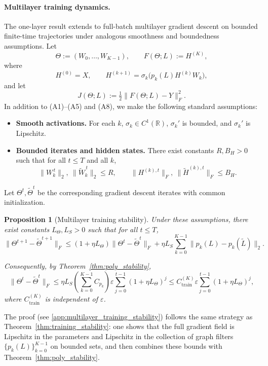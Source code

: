 \documentclass{article}
\newtheorem{proposition}{Proposition}
\begin{document}
\paragraph{Multilayer training dynamics.}
The one-layer result extends to full-batch multilayer gradient descent on bounded finite-time trajectories under analogous smoothness and boundedness assumptions. Let
\[
\Theta:=(W_0,\dots,W_{K-1}), \qquad
F(\Theta;L):=H^{(K)},
\]
where
\[
H^{(0)}=X, \qquad
H^{(k+1)}=\sigma_k\!\bigl(p_k(L)H^{(k)}W_k\bigr),
\]
and let
\[
J(\Theta;L):=\tfrac12\|F(\Theta;L)-Y\|_F^2.
\]
In addition to (A1)--(A5) and (A8), we make the following standard assumptions:
\begin{itemize}
    \item[(A6$'$)] \textbf{Smooth activations.}
    For each $k$, $\sigma_k \in C^1(\mathbb{R})$, $\sigma_k'$ is bounded, and $\sigma_k'$ is Lipschitz.
    \item[(A7$'$)] \textbf{Bounded iterates and hidden states.}
    There exist constants $R,B_H>0$ such that for all $t\le T$ and all $k$,
    \[
    \|W_k^{\,t}\|_2,\ \|\widetilde W_k^{\,t}\|_2 \le R,
    \qquad
    \|H^{(k),t}\|_F,\ \|\widetilde H^{(k),t}\|_F \le B_H.
    \]
\end{itemize}
Let $\Theta^t,\widetilde\Theta^t$ be the corresponding gradient descent iterates with common initialization.

\begin{proposition}[Multilayer training stability]
\label{prop:multilayer_training_stability}
Under these assumptions, there exist constants $L_\Theta,L_S>0$ such that for all $t\le T$,
\begin{equation}
\label{eq:theorem_training_multi_layer_main}
\|\Theta^{t+1}-\widetilde\Theta^{t+1}\|_F
\le
(1+\eta L_\Theta)\|\Theta^t-\widetilde\Theta^t\|_F
+
\eta L_S \sum_{k=0}^{K-1}\|p_k(L)-p_k(\widetilde L)\|_2.
\end{equation}

Consequently, by Theorem~\ref{thm:poly_stability},
\[
\|\Theta^t-\widetilde\Theta^t\|_F
\le
\eta L_S
\left(\sum_{k=0}^{K-1} C_{p_k}\right)
\varepsilon
\sum_{j=0}^{t-1}(1+\eta L_\Theta)^j
\le
C_{\mathrm{train}}^{(K)}\varepsilon
\sum_{j=0}^{t-1}(1+\eta L_\Theta)^j,
\]
where $C_{\mathrm{train}}^{(K)}$ is independent of $\varepsilon$.

\end{proposition}


The proof (see \ref{app:multilayer_training_stability}) follows the same strategy as Theorem~\ref{thm:training_stability}: one shows that the full gradient field is Lipschitz in the parameters and Lipschitz in the collection of graph filters $\{p_k(L)\}_{k=0}^{K-1}$ on bounded sets, and then combines these bounds with Theorem~\ref{thm:poly_stability}.
\end{document}
